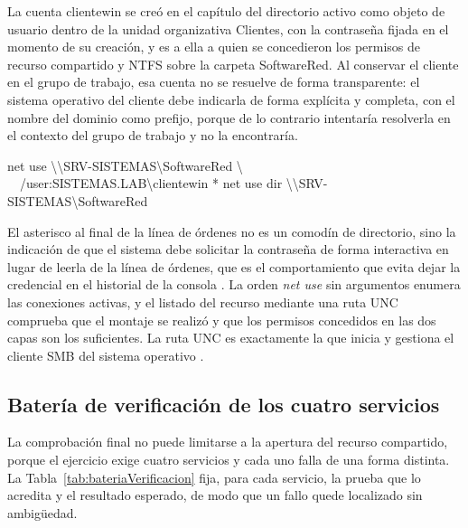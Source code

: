 \documentclass[12pt]{article}
\begin{document}
La cuenta clientewin se creó en el capítulo del directorio activo como objeto de usuario dentro de la unidad organizativa Clientes, con la contraseña fijada en el momento de su creación, y es a ella a quien se concedieron los permisos de recurso compartido y NTFS sobre la carpeta SoftwareRed. Al conservar el cliente en el grupo de trabajo, esa cuenta no se resuelve de forma transparente: el sistema operativo del cliente debe indicarla de forma explícita y completa, con el nombre del dominio como prefijo, porque de lo contrario intentaría resolverla en el contexto del grupo de trabajo y no la encontraría.

\begin{mdframed}[style=terminal]
\ttfamily\upshape\color{bashLetterColor}\footnotesize
net use \textbackslash\textbackslash SRV-SISTEMAS\textbackslash SoftwareRed \textbackslash\\
\ \ /user:SISTEMAS.LAB\textbackslash clientewin *
net use
dir \textbackslash\textbackslash SRV-SISTEMAS\textbackslash SoftwareRed
\end{mdframed}

El asterisco al final de la línea de órdenes no es un comodín de directorio, sino la indicación de que el sistema debe solicitar la contraseña de forma interactiva en lugar de leerla de la línea de órdenes, que es el comportamiento que evita dejar la credencial en el historial de la consola \parencite{microsoftSharedFolderAccess}. La orden \textit{net use} sin argumentos enumera las conexiones activas, y el listado del recurso mediante una ruta UNC comprueba que el montaje se realizó y que los permisos concedidos en las dos capas son los suficientes. La ruta UNC es exactamente la que inicia y gestiona el cliente SMB del sistema operativo \parencite{microsoftSmbOverview}.

\subsection{Batería de verificación de los cuatro servicios}
\label{sec:verificacionServicios}

La comprobación final no puede limitarse a la apertura del recurso compartido, porque el ejercicio exige cuatro servicios y cada uno falla de una forma distinta. La Tabla~\ref{tab:bateriaVerificacion} fija, para cada servicio, la prueba que lo acredita y el resultado esperado, de modo que un fallo quede localizado sin ambigüedad.
\end{document}
